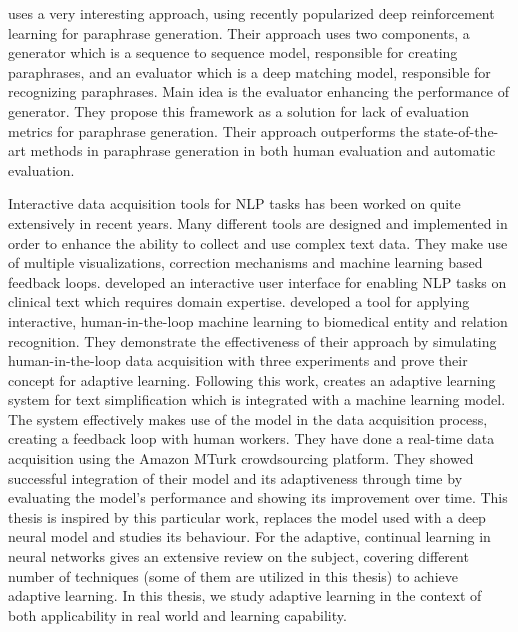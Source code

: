 \cite{Lietal} uses a very interesting approach, using recently popularized deep reinforcement learning for paraphrase generation. Their approach uses two components, a generator which is a sequence to sequence model, responsible for creating paraphrases, and an evaluator which is a deep matching model, responsible for recognizing paraphrases. Main idea is the evaluator enhancing the performance of generator. They propose this framework as a solution for lack of evaluation metrics for paraphrase generation. Their approach outperforms the state-of-the-art methods in paraphrase generation in both human evaluation and automatic evaluation.

Interactive data acquisition tools for NLP tasks has been worked on quite extensively in recent years. Many different tools are designed and implemented in order to enhance the ability to collect and use complex text data. They make use of multiple visualizations, correction mechanisms and machine learning based feedback loops. \cite{trivedi} developed an interactive user interface for enabling NLP tasks on clinical text which requires domain expertise. \cite{Yimam:2016aa} developed a tool for applying interactive, human-in-the-loop machine learning to biomedical entity and relation recognition. They demonstrate the effectiveness of their approach by simulating human-in-the-loop data acquisition with three experiments and prove their concept for adaptive learning. Following this work, \cite{par4sim} creates an adaptive learning system for text simplification which is integrated with a machine learning model. The system effectively makes use of the model in the data acquisition process, creating a feedback loop with human workers. They have done a real-time data acquisition using the Amazon MTurk crowdsourcing platform. They showed successful integration of their model and its adaptiveness through time by evaluating the model's performance and showing its improvement over time. This thesis is inspired by this particular work, replaces the model used with a deep neural model and studies its behaviour. For the adaptive, continual learning in neural networks \cite{parisi} gives an extensive review on the subject, covering different number of techniques (some of them are utilized in this thesis) to achieve adaptive learning. In this thesis, we study adaptive learning in the context of both applicability in real world and learning capability.

